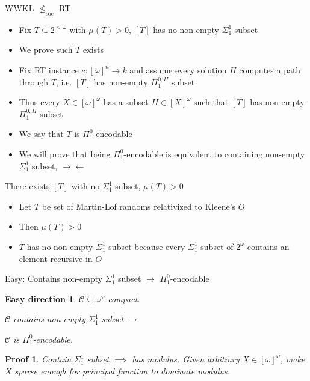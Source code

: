 \documentclass[notes]{beamer}
\begin{document}
\begin{frame}{WWKL $\nleq_{\text{soc}}$ RT}
  \begin{itemize}
    \item Fix $T\subseteq 2^{<\omega}$ with $\mu(T)>0$, $[T]$
      has no non-empty $\Sigma_1^1$ subset
    \item We prove such $T$ exists
    \item Fix RT instance $c:[\omega]^n\rightarrow k$ and assume every
      solution $H$ computes a path through $T$, i.e. $[T]$ has non-empty
      $\Pi_1^{0,H}$ subset
    \item Thus every $X\in[\omega]^\omega$ has a subset
      $H\in[X]^\omega$ such that $[T]$ has non-empty $\Pi_1^{0,H}$ subset
    \item We say that $T$ is $\Pi_1^0$-encodable
    \item We will prove that being $\Pi_1^0$-encodable is equivalent to
      containing non-empty $\Sigma_1^1$ subset, $\rightarrow\leftarrow$
  \end{itemize}
\end{frame}

\begin{frame}{There exists $[T]$ with no $\Sigma_1^1$ subset, $\mu(T)>0$}
  \begin{itemize}
    \item Let $T$ be set of Martin-Lof randoms relativized to Kleene's $O$
    \item Then $\mu(T)>0$
    \item $T$ has no non-empty $\Sigma_1^1$ subset because every
      $\Sigma_1^1$ subset of $2^\omega$ contains an element recursive in
      $O$
  \end{itemize}
\end{frame}

\begin{frame}{Easy: Contains non-empty $\Sigma_1^1$ subset $\rightarrow$
$\Pi_1^0$-encodable}
  \newtheorem{main-easy}{Easy direction}
  \begin{main-easy}
    $\mathcal{C}\subseteq \omega^{\omega}$ compact.

    $\mathcal{C}$ contains non-empty $\Sigma_1^1$ subset
    $\rightarrow$

    $\mathcal{C}$ is $\Pi_1^0$-encodable.
  \end{main-easy}

  \newtheorem{pf-easy}{Proof}
  \begin{pf-easy}
    Contain $\Sigma_1^1$ subset $\implies$ has modulus. Given arbitrary
    $X\in[\omega]^\omega$, make $X$ sparse enough for principal function to
    dominate modulus.
  \end{pf-easy}
\end{frame}
\end{document}
